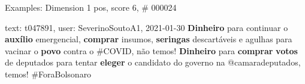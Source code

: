 \begin{frame}{Examples: Dimension 1 pos, score 6, \# 000024}
\footnotesize
\begin{exampleblock}{text: t047891, user: SeverinoSoutoA1, 2021-01-30}
\textbf{Dinheiro} para continuar o \textbf{auxílio} emergencial, 
\textbf{comprar} insumos, \textbf{seringas} descartáveis e agulhas para vacinar 
o \textbf{povo} contra o \#COVID, não temos! \textbf{Dinheiro} para 
\textbf{comprar} \textbf{votos} de deputados para tentar \textbf{eleger} o 
candidato do governo na @camaradeputados, temos! \#ForaBolsonaro 
\end{exampleblock}
\end{frame}
